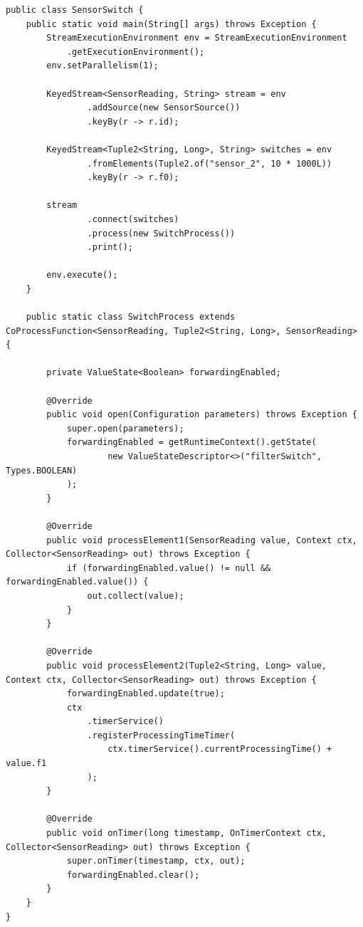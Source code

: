 \documentclass[cn,11pt,chinese]{elegantbook}
\begin{document}
\begin{verbatim}
public class SensorSwitch {
    public static void main(String[] args) throws Exception {
        StreamExecutionEnvironment env = StreamExecutionEnvironment
            .getExecutionEnvironment();
        env.setParallelism(1);

        KeyedStream<SensorReading, String> stream = env
                .addSource(new SensorSource())
                .keyBy(r -> r.id);

        KeyedStream<Tuple2<String, Long>, String> switches = env
                .fromElements(Tuple2.of("sensor_2", 10 * 1000L))
                .keyBy(r -> r.f0);

        stream
                .connect(switches)
                .process(new SwitchProcess())
                .print();

        env.execute();
    }

    public static class SwitchProcess extends CoProcessFunction<SensorReading, Tuple2<String, Long>, SensorReading> {

        private ValueState<Boolean> forwardingEnabled;

        @Override
        public void open(Configuration parameters) throws Exception {
            super.open(parameters);
            forwardingEnabled = getRuntimeContext().getState(
                    new ValueStateDescriptor<>("filterSwitch", Types.BOOLEAN)
            );
        }

        @Override
        public void processElement1(SensorReading value, Context ctx, Collector<SensorReading> out) throws Exception {
            if (forwardingEnabled.value() != null && forwardingEnabled.value()) {
                out.collect(value);
            }
        }

        @Override
        public void processElement2(Tuple2<String, Long> value, Context ctx, Collector<SensorReading> out) throws Exception {
            forwardingEnabled.update(true);
            ctx
                .timerService()
                .registerProcessingTimeTimer(
                    ctx.timerService().currentProcessingTime() + value.f1
                );
        }

        @Override
        public void onTimer(long timestamp, OnTimerContext ctx, Collector<SensorReading> out) throws Exception {
            super.onTimer(timestamp, ctx, out);
            forwardingEnabled.clear();
        }
    }
}
\end{verbatim}
\end{document}
